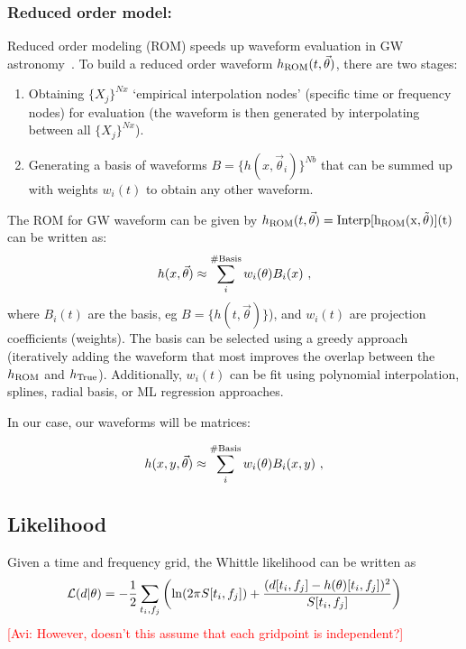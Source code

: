 \documentclass{article}
\newcommand{\avi}[1]{\textcolor{red}{[Avi: #1]}}
\begin{document}
\subsubsection{Reduced order model:}
Reduced order modeling (ROM) speeds up waveform evaluation in GW astronomy~\cite{2022LRR....25....2T}. To build a reduced order waveform $h_{\rm ROM}(t, \vec{\theta})$, there are two stages:
\begin{enumerate}
    \item Obtaining $\{X_j\}^{Nx}$ `empirical interpolation nodes' (specific time or frequency nodes) for evaluation (the waveform is then generated by interpolating between all $\{X_j\}^{Nx}$).
    \item Generating a basis of waveforms $B=\{h(x,\vec{\theta}_i)\}^{Nb}$ that can be summed up with weights $w_i(t)$ to obtain any other waveform.
\end{enumerate}

The ROM for GW waveform can be given by $h_{\rm ROM}(t,\vec{\theta})=\rm{Interp}[h_{\rm ROM}(x,\vec{\theta})](t)$ can be written as:
\begin{equation}
    h(x,\vec{\theta}) \approx \sum^{\rm \#Basis}_i w_i(\theta) B_i(x)\ ,
\end{equation}
where $B_i(t)$ are the basis, eg $B = \{h(t, \vec{\theta})\}$), and $w_i(t)$ are projection coefficients (weights). The basis can be selected using a greedy approach (iteratively adding the waveform that most improves the overlap between the $h_{\rm ROM}$ and $h_{\rm True}$). Additionally, $w_i(t)$ can be fit using  polynomial interpolation, splines, radial basis, or ML
regression approaches.


In our case, our waveforms will be matrices:

\begin{equation}
    h(x,y,\vec{\theta}) \approx \sum^{\rm \#Basis}_i w_i(\theta) B_i(x,y)\ ,
\end{equation}







\subsection{Likelihood}
Given a time and frequency grid, the Whittle likelihood can be written as 
\begin{equation}
    \mathcal{L}(d|\theta) = -\frac{1}{2}\sum_{t_i,f_j}\left( {\rm ln}(2\pi S[t_i,f_j]) + \frac{(d[t_i,f_j] -h(\theta)[t_i,f_j])^2}{S[t_i,f_j]} \right)
\end{equation}
\avi{However, doesn't this assume that each gridpoint is independent?}
\end{document}
